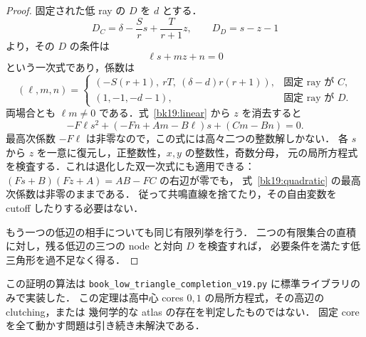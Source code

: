 \begin{proof}
固定された低 ray の $D$ を $d$ とする．
\[
 D_C=\delta-\frac Sr s+\frac T{r+1}z,\qquad
 D_D=s-z-1
\]
より，その $D$ の条件は
\begin{equation}\label{bk19:linear}
 \ell s+mz+n=0
\end{equation}
という一次式であり，係数は
\[
 (\ell,m,n)=
 \begin{cases}
 (-S(r+1),\ rT,\ (\delta-d)r(r+1)),&\text{固定 ray が }C,\\
 (1,-1,-d-1),&\text{固定 ray が }D.
 \end{cases}
\]
両場合とも $\ell m\ne0$ である．式~\eqref{bk19:linear} から $z$ を消去すると
\begin{equation}\label{bk19:quadratic}
 -F\ell s^2+(-Fn+Am-B\ell)s+(Cm-Bn)=0.
\end{equation}
最高次係数 $-F\ell$ は非零なので，この式には高々二つの整数解しかない．
各 $s$ から $z$ を一意に復元し，正整数性，$x,y$ の整数性，奇数分母，
元の局所方程式を検査する．これは退化した双一次式にも適用できる：
$(Fs+B)(Fz+A)=AB-FC$ の右辺が零でも，
式~\eqref{bk19:quadratic} の最高次係数は非零のままである．
従って共鳴直線を捨てたり，その自由変数を cutoff したりする必要はない．

もう一つの低辺の相手についても同じ有限列挙を行う．
二つの有限集合の直積に対し，残る低辺の三つの node と対向 $D$ を検査すれば，
必要条件を満たす低三角形を過不足なく得る．
\end{proof}

この証明の算法は
\texttt{book\_low\_triangle\_completion\_v19.py} に標準ライブラリのみで実装した．
この定理は高中心 cores $0,1$ の局所方程式，その高辺の clutching，または
幾何学的な atlas の存在を判定したものではない．
固定 core を全て動かす問題は引き続き未解決である．
